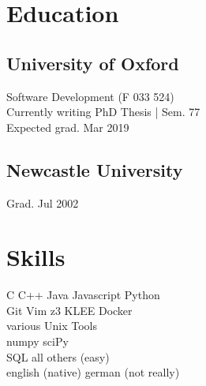 \documentclass[]{resume}
\begin{document}
	
\lastupdated




\vfill
\begin{minipage}[t]{0.33\textwidth} 
\section{Education} 
	\subsection{University of Oxford}
		Software Development (F 033 524)\\
		Currently writing PhD Thesis | Sem. 77 \\
		Expected grad. Mar 2019
	\sectionsep

	\subsection{Newcastle University}
		Grad. Jul 2002
	\sectionsep

\section{Skills}
	C \textbullet{} C++ \textbullet{} Java \textbullet{} Javascript \textbullet{} Python \\ \sectionsep 
	Git \textbullet{} Vim \textbullet{} z3 \textbullet{} KLEE \textbullet{} Docker\\ 
	various Unix Tools \\ \sectionsep 
	numpy \textbullet{} sciPy \\ \sectionsep 
	SQL \textbullet{} all others (easy)\\ \sectionsep 
	english (native) \textbullet{} german (not really)
	
\end{minipage}\quad %
\end{document}
